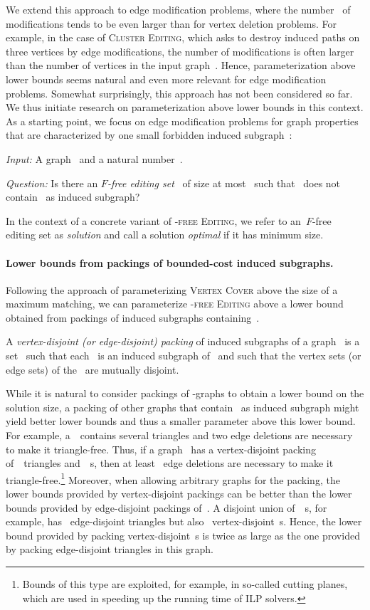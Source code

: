 \documentclass[envcountsame,numbook,smallextended]{svjour3}
\numberwithin{equation}{section}
\numberwithin{figure}{section}
\newcommand{\decprob}[3]{\pagebreak[3]
  \begin{problem}[\boldmath#1]
    \begin{compactdesc}
        \item[\normalfont\it Input:] #2
        \item[\normalfont\it Question:] #3
    \end{compactdesc}
  \end{problem}
}
\newcommand{\ffed}{\textsc{-free Editing}}
\newcommand{\gfedset}[1]{\ensuremath{#1}-free editing set}
\begin{document}
We extend this approach to edge modification problems, where the number~ of modifications tends to be even larger than for vertex deletion problems. For example, in the case of \textsc{Cluster Editing}, which asks to destroy induced paths on three vertices by edge modifications, the number of modifications is often larger than the number of vertices in the input graph~\cite{BBBT09}. Hence, parameterization above lower bounds
seems natural and even more relevant for edge modification problems. Somewhat surprisingly, this approach has not been considered so far.
We thus initiate research on parameterization above lower bounds in this context.
As a starting point, we focus on edge modification problems for graph properties that are characterized by one small forbidden induced subgraph~:

\decprob{\textsc{-free Editing}}{A graph~ and a natural number~.}{Is there an \emph{\gfedset{F}}~ of size at most~ such that~ does not contain~ as induced subgraph?}
In the context of a concrete variant of \ffed{}, we refer to an~\gfedset{F} as \emph{solution} and call a solution \emph{optimal} if it has minimum size.  

\paragraph{Lower bounds from packings of bounded-cost induced subgraphs.}
Following the approach of parameterizing \textsc{Vertex Cover} above the size of a maximum matching, we can parameterize \ffed{} above a lower bound obtained from packings of induced subgraphs containing~.

\begin{definition}
  A \emph{vertex-disjoint (or edge-disjoint) packing} of induced subgraphs of a graph~ is a set~ such that each~ is an induced subgraph of~ and such that the vertex sets (or edge sets) of the~ are mutually disjoint.
\end{definition}
While it is natural to consider packings of -graphs to obtain a lower bound on the solution size, a packing of other graphs that contain~ as induced subgraph might yield better lower bounds and thus a smaller parameter above this lower bound. For example, a~~contains several triangles and two edge deletions are necessary to make it triangle-free. Thus, if a graph~ has a vertex-disjoint packing of~~triangles and~~s, then at least~ edge deletions are necessary to make it triangle-free.\footnote{Bounds of this type are exploited, for example, in so-called cutting planes, which are used in speeding up the running time of ILP solvers. } Moreover, when allowing arbitrary graphs for the packing, the lower bounds provided by vertex-disjoint packings can be better than the lower bounds provided by edge-disjoint packings of~. A disjoint union of~~s, for example, has~ edge-disjoint triangles but also~ vertex-disjoint~s. Hence, the lower bound provided by packing vertex-disjoint~s is twice as large as the one provided by packing edge-disjoint triangles in this graph.
\end{document}
